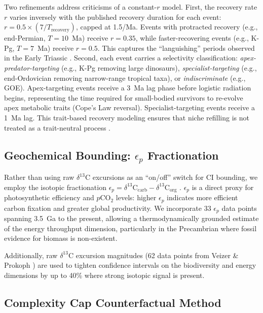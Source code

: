 \documentclass[10pt,letterpaper]{article}
\begin{document}
Two refinements address criticisms of a constant-$r$ model. First, the
recovery rate $r$ varies inversely with the published recovery duration for
each event: $r = 0.5 \times (7 / T_\text{recovery})$, capped at 1.5/Ma.
Events with protracted recovery (e.g., end-Permian, $T = 10$~Ma) receive
$r = 0.35$, while faster-recovering events (e.g., K-Pg, $T = 7$~Ma) receive
$r = 0.5$. This captures the ``languishing'' periods observed in the
Early Triassic \cite{chen2012}. Second, each event carries a selectivity
classification: \emph{apex-predator-targeting} (e.g., K-Pg removing large
dinosaurs), \emph{specialist-targeting} (e.g., end-Ordovician removing
narrow-range tropical taxa), or \emph{indiscriminate} (e.g., GOE).
Apex-targeting events receive a 3~Ma lag phase before logistic radiation
begins, representing the time required for small-bodied survivors to
re-evolve apex metabolic traits (Cope's Law reversal). Specialist-targeting
events receive a 1~Ma lag. This trait-based recovery modeling ensures that
niche refilling is not treated as a trait-neutral process
\cite{jablonski1986}.

\subsection*{Geochemical Bounding: $\epsilon_p$ Fractionation}

Rather than using raw $\delta^{13}$C excursions as an ``on/off'' switch for
CI bounding, we employ the isotopic fractionation $\epsilon_p =
\delta^{13}$C$_\text{carb} - \delta^{13}$C$_\text{org}$ \cite{hayes1999,
freeman1992}. $\epsilon_p$ is a direct proxy for photosynthetic efficiency
and $p$CO$_2$ levels: higher $\epsilon_p$ indicates more efficient carbon
fixation and greater global productivity. We incorporate 33 $\epsilon_p$
data points spanning 3.5~Ga to the present, allowing a thermodynamically
grounded estimate of the energy throughput dimension, particularly in the
Precambrian where fossil evidence for biomass is non-existent.

Additionally, raw $\delta^{13}$C excursion magnitudes (62 data points from
Veizer \& Prokoph \cite{veizer2015}) are used to tighten confidence intervals
on the biodiversity and energy dimensions by up to 40\% where strong
isotopic signal is present.

\subsection*{Complexity Cap Counterfactual Method}
\end{document}
